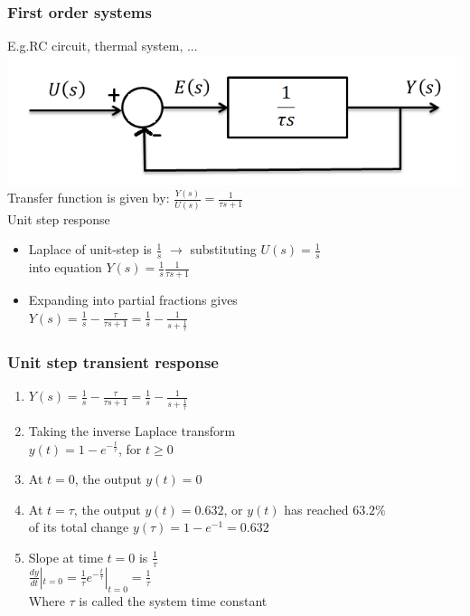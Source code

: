 \begin{frame}
\frametitle{First order systems}
E.g.RC circuit, thermal system, ...
\vspace{0.15cm}
\\ \includegraphics[width=0.6\linewidth]{Afbeelding1}
\vspace{0.15cm}
\pause
\\Transfer function is given by: $\frac{Y(s)}{U(s)} = \frac{1}{\tau s +1}$
\vspace{0.15cm}
\pause
\\Unit step response
\begin{itemize}
\vspace{0.15cm}
\item Laplace of unit-step is $\frac{1}{s}$ $\rightarrow$ substituting $U(s)= \frac{1}{s}$ \\
\vspace{0.15cm}
into equation $Y(s) = \frac{1}{s}\frac{1}{\tau s +1}$
\vspace{0.15cm}
\item Expanding into partial fractions gives
\vspace{0.15cm}
\\ $Y(s)= \frac{1}{s} - \frac{\tau}{\tau s +1} = \frac{1}{s} - \frac{1}{s+\frac{1}{\tau}}$
\end{itemize}
\end{frame}

\begin{frame}
\frametitle{Unit step transient response}
\begin{enumerate}
\item$Y(s)= \frac{1}{s} - \frac{\tau}{\tau s +1} = \frac{1}{s} - \frac{1}{s+\frac{1}{\tau}}$
\vspace{0.2cm}
\pause
\item Taking the inverse Laplace transform
\vspace{0.2cm}
\\ $y(t) = 1 - e^{-\frac{t}{\tau}}$, for $t\ge 0$ 
\vspace{0.2cm}
\pause
\item At $t=0$, the output $y(t)=0$
\vspace{0.2cm}
\pause
\item At $t=\tau$, the output $y(t)=0.632$, or $y(t)$ has reached $63.2\% $ 
\vspace{0.01cm} 
\\ of its total change $y(\tau)= 1 - e^{-1} = 0.632$
\vspace{0.2cm}
\pause
\item Slope at time $t=0$ is $\frac{1}{\tau}$
\vspace{0.2cm}
\\ $\frac{dy}{dt}|_{t=0} = \frac{1}{\tau}e^{-\frac{t}{\tau}}|_{t=0} = \frac{1}{\tau}$
\vspace{0.2cm}
\\ Where $\tau$ is called the system time constant
\end{enumerate}
\end{frame}


